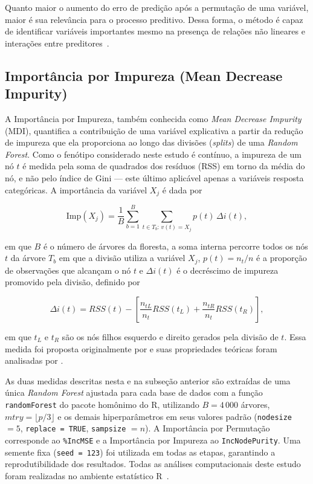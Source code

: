 \documentclass[12pt,fleqn]{article}
\newcommand{\citeonline}[1]{\citet{#1}}
\begin{document}
Quanto maior o aumento do erro de predição após a permutação de uma variável, maior é sua relevância para o processo preditivo. Dessa forma, o método é capaz de identificar variáveis importantes mesmo na presença de relações não lineares e interações entre preditores~\citep{breiman2001random, Strobl2007, Strobl2008}.

\subsection{Importância por Impureza (Mean Decrease Impurity)}

A Importância por Impureza, também conhecida como \textit{Mean Decrease Impurity} (MDI), quantifica a contribuição de uma variável explicativa a partir da redução de impureza que ela proporciona ao longo das divisões (\textit{splits}) de uma \textit{Random Forest}. Como o fenótipo considerado neste estudo é contínuo, a impureza de um nó $t$ é medida pela soma de quadrados dos resíduos (RSS) em torno da média do nó, e não pelo índice de Gini — este último aplicável apenas a variáveis resposta categóricas. A importância da variável $X_j$ é dada por

\begin{equation}
    \text{Imp}(X_j) = \frac{1}{B} \sum_{b=1}^{B} \sum_{t \in T_b:\, v(t) = X_j} p(t)\, \Delta i(t),
\end{equation}

\noindent em que $B$ é o número de árvores da floresta, a soma interna percorre todos os nós $t$ da árvore $T_b$ em que a divisão utiliza a variável $X_j$, $p(t) = n_t/n$ é a proporção de observações que alcançam o nó $t$ e $\Delta i(t)$ é o decréscimo de impureza promovido pela divisão, definido por

\begin{equation}
    \Delta i(t) = RSS(t) - \left[ \frac{n_{tL}}{n_t} RSS(t_L) + \frac{n_{tR}}{n_t} RSS(t_R) \right],
\end{equation}

\noindent em que $t_L$ e $t_R$ são os nós filhos esquerdo e direito gerados pela divisão de $t$. Essa medida foi proposta originalmente por \citeonline{breiman2001random} e suas propriedades teóricas foram analisadas por \citeonline{Scornet2023}.

As duas medidas descritas nesta e na subseção anterior são extraídas de uma única \textit{Random Forest} ajustada para cada base de dados com a função \texttt{randomForest} do pacote homônimo do R, utilizando $B = 4\,000$ árvores, $mtry = \lfloor p/3 \rfloor$ e os demais hiperparâmetros em seus valores padrão (\texttt{nodesize} $= 5$, \texttt{replace = TRUE}, \texttt{sampsize} $= n$). A Importância por Permutação corresponde ao \texttt{\%IncMSE} e a Importância por Impureza ao \texttt{IncNodePurity}. Uma semente fixa (\texttt{seed = 123}) foi utilizada em todas as etapas, garantindo a reprodutibilidade dos resultados. Todas as análises computacionais deste estudo foram realizadas no ambiente estatístico R~\citep{R}.
\end{document}
